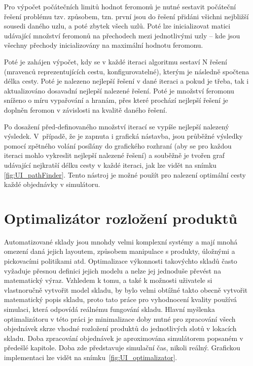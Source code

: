 Pro výpočet počátečních limitů hodnot feromonů je nutné sestavit počáteční řešení problému tzv.  způsobem, tzn. první jsou do řešení přidáni všichni nejbližší sousedi daného uzlu, a poté zbytek všech uzlů. Poté lze inicializovat matici udávající množství feromonů na přechodech mezi jednotlivými uzly -- kde jsou všechny přechody inicializovány na maximální hodnotu feromonu.

Poté je zahájen výpočet, kdy se v každé iteraci algoritmu sestaví N řešení (mravenců reprezentujících cestu, konfigurovatelné), kterým je následně spočtena délka cesty. Poté je nalezeno nejlepší řešení v dané iteraci a pokud je třeba, tak i aktualizováno dosavadní nejlepší nalezené řešení. Poté je množství feromonu sníženo o míru vypařování a hranám, přes které prochází nejlepší řešení je doplněn feromon v závislosti na kvalitě daného řešení.

Po dosažení před-definovaného množství iterací se vypíše nejlepší nalezený výsledek. V~případě, že je zapnuta i grafická nástavba, jsou průběžné výsledky pomocí zpětného volání posílány do grafického rozhraní (aby se pro každou iteraci mohlo vykreslit nejlepší nalezené řešení) a souběžně je tvořen graf udávající nejkratší délku cesty v každé iteraci, jak lze vidět na snímku \ref{fig:UI_pathFinder}. Tento nástroj je možné použít pro nalezení optimální cesty každé objednávky v simulátoru.

\section{Optimalizátor rozložení produktů}
Automatizované sklady jsou mnohdy velmi komplexní systémy a mají mnohá omezení daná jejich layoutem, způsobem manipulace s produkty, úložnými a pickovacími politikami atd. Optimalizace výkonnosti takovýchto skladů často vyžaduje přesnou definici jejich modelu a nelze jej jednoduše převést na matematický výraz. Vzhledem k tomu, a také k možnosti uživatele si vlastnoručně vytvořit model skladu, by bylo velmi obtížné takto obecně vytvořit matematický popis skladu, proto tato práce pro vyhodnocení kvality používá simulaci, která odpovídá reálnému fungování skladu. Hlavní myšlenka optimalizátoru v této práci je minimalizace doby nutné pro zpracování všech objednávek skrze vhodné rozložení produktů do jednotlivých slotů v lokacích skladu. Doba zpracování objednávek je aproximována simulátorem popsaném v předešlé kapitole. Doba zde představuje simulační čas, nikoli reálný. Grafickou implementaci lze vidět na snímku~\ref{fig:UI_optimalizator}.

